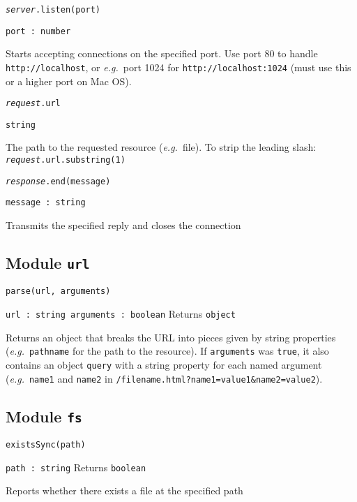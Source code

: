 \documentclass[12pt,letterpaper]{article}
\newenvironment{itemize*}%
	{\begin{itemize}%
		\setlength{\itemsep}{0pt}%
		\setlength{\parskip}{0pt}%
		\footnotesize%
	}%
	{\end{itemize}}
\begin{document}
\texttt{\textit{server}.listen(port)}
\begin{itemize*}
\item[] \texttt{port :\ number}
\item[] Starts accepting connections on the specified port.
	Use port 80 to handle \texttt{http://localhost}, or \textit{e.g.}\ port 1024 for \texttt{http://localhost:1024} (must use this or a higher port on Mac OS).
\end{itemize*}

\texttt{\textit{request}.url}
\begin{itemize*}
\item[] \texttt{string}
\item[] The path to the requested resource (\textit{e.g.}\ file).
	To strip the leading slash: \texttt{\textit{request}.url.substring(1)}
\end{itemize*}

\texttt{\textit{response}.end(message)}
\begin{itemize*}
\item[] \texttt{message :\ string}
\item[] Transmits the specified reply and closes the connection
\end{itemize*}

\subsection*{Module \texttt{url}}

\texttt{parse(url, arguments)}
\begin{itemize*}
\item[] \texttt{url :\ string \quad arguments :\ boolean} \qquad Returns \texttt{object}
\item[] Returns an object that breaks the URL into pieces given by string properties (\textit{e.g.}\ \texttt{pathname} for the path to the resource).
	If \texttt{arguments} was \texttt{true}, it also contains an object \texttt{query} with a string property for each named argument (\textit{e.g.}\ \texttt{name1} and \texttt{name2} in \texttt{/filename.html?name1=value1\&name2=value2}).
\end{itemize*}

\subsection*{Module \texttt{fs}}

\texttt{existsSync(path)}
\begin{itemize*}
\item[] \texttt{path :\ string} \qquad Returns \texttt{boolean}
\item[] Reports whether there exists a file at the specified path
\end{itemize*}
\end{document}
